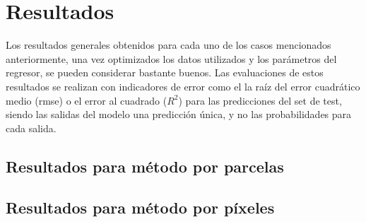 
\chapter{Resultados}
\label{resultados}
\par Los resultados generales obtenidos para cada uno de los casos mencionados anteriormente, una vez optimizados los datos utilizados y los parámetros del regresor, se pueden considerar bastante buenos. Las evaluaciones de estos resultados se realizan con indicadores de error como el la raíz del error cuadrático medio (\gls{rmse}) o el error al cuadrado ($R^2$) para las predicciones del set de test, siendo las salidas del modelo una predicción única, y no las probabilidades para cada salida. 

\section{Resultados para método por parcelas}
\section{Resultados para método por píxeles} 
